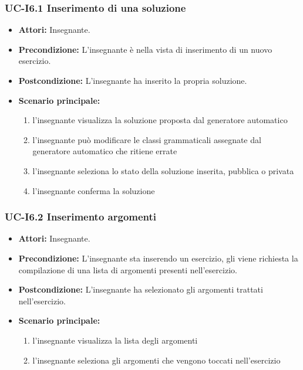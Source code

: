 \subsubsection{UC-I6.1 Inserimento di una soluzione}
\begin{itemize}
\item \textbf{Attori: }Insegnante.
\item \textbf{Precondizione: }L'insegnante è nella vista di inserimento di un nuovo esercizio.
\item \textbf{Postcondizione: }L'insegnante ha inserito la propria soluzione.
\item \textbf{Scenario principale: }
		\begin{enumerate} 
		\item l'insegnante visualizza la soluzione proposta dal generatore automatico
		\item l'insegnante può modificare le classi grammaticali assegnate dal generatore automatico che ritiene errate
		\item l'insegnante seleziona lo stato della soluzione inserita, pubblica o privata
		\item l'insegnante conferma la soluzione
		\end{enumerate}	
\end{itemize}

\subsubsection{UC-I6.2 Inserimento argomenti}
\begin{itemize}
\item \textbf{Attori: }Insegnante.

\item \textbf{Precondizione:} L'insegnante sta inserendo un esercizio, gli viene richiesta la compilazione di una lista di argomenti presenti nell'esercizio.
\item \textbf{Postcondizione:} L'insegnante ha selezionato gli argomenti trattati nell'esercizio.
\item \textbf{Scenario principale: }
		\begin{enumerate}
		\item l'insegnante visualizza la lista degli argomenti
		\item l'insegnante seleziona gli argomenti che vengono toccati nell'esercizio
		\end{enumerate}
\end{itemize}				

